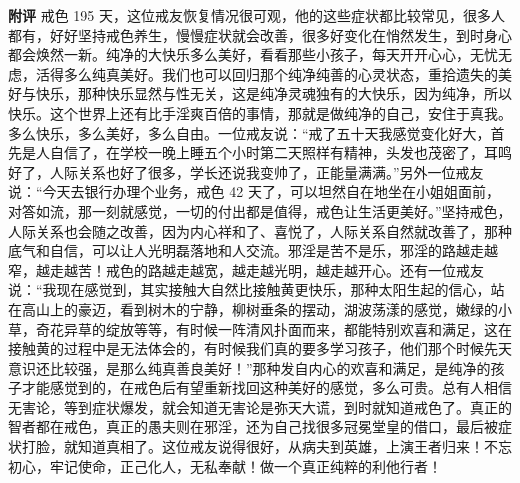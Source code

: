 \begin{case}
    \textbf{附评} 戒色 195 天，这位戒友恢复情况很可观，他的这些症状都比较常见，很多人都有，好好坚持戒色养生，慢慢症状就会改善，很多好变化在悄然发生，到时身心都会焕然一新。纯净的大快乐多么美好，看看那些小孩子，每天开开心心，无忧无虑，活得多么纯真美好。我们也可以回归那个纯净纯善的心灵状态，重拾遗失的美好与快乐，那种快乐显然与性无关，这是纯净灵魂独有的大快乐，因为纯净，所以快乐。这个世界上还有比手淫爽百倍的事情，那就是做纯净的自己，安住于真我。多么快乐，多么美好，多么自由。一位戒友说：“戒了五十天我感觉变化好大，首先是人自信了，在学校一晚上睡五个小时第二天照样有精神，头发也茂密了，耳鸣好了，人际关系也好了很多，学长还说我变帅了，正能量满满。”另外一位戒友说：“今天去银行办理个业务，戒色 42 天了，可以坦然自在地坐在小姐姐面前，对答如流，那一刻就感觉，一切的付出都是值得，戒色让生活更美好。”坚持戒色，人际关系也会随之改善，因为内心祥和了、喜悦了，人际关系自然就改善了，那种底气和自信，可以让人光明磊落地和人交流。邪淫是苦不是乐，邪淫的路越走越窄，越走越苦！戒色的路越走越宽，越走越光明，越走越开心。还有一位戒友说：“我现在感觉到，其实接触大自然比接触黄更快乐，那种太阳生起的信心，站在高山上的豪迈，看到树木的宁静，柳树垂条的摆动，湖波荡漾的感觉，嫩绿的小草，奇花异草的绽放等等，有时候一阵清风扑面而来，都能特别欢喜和满足，这在接触黄的过程中是无法体会的，有时候我们真的要多学习孩子，他们那个时候先天意识还比较强，是那么纯真善良美好！”那种发自内心的欢喜和满足，是纯净的孩子才能感觉到的，在戒色后有望重新找回这种美好的感觉，多么可贵。总有人相信无害论，等到症状爆发，就会知道无害论是弥天大谎，到时就知道戒色了。真正的智者都在戒色，真正的愚夫则在邪淫，还为自己找很多冠冕堂皇的借口，最后被症状打脸，就知道真相了。这位戒友说得很好，从病夫到英雄，上演王者归来！不忘初心，牢记使命，正己化人，无私奉献！做一个真正纯粹的利他行者！
\end{case}

